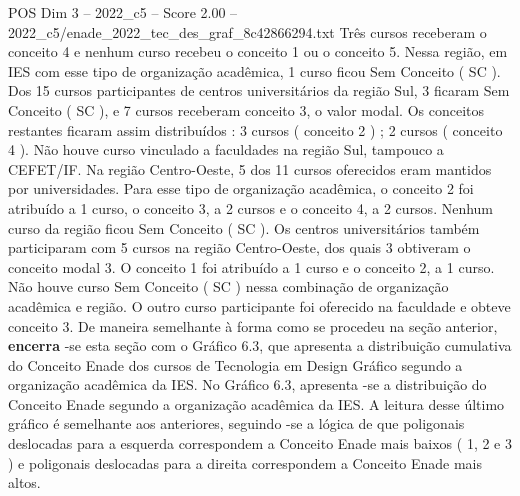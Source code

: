 \begin{textsample}{POS Dim 3 – 2022\_c5 – Score 2.00 – 2022\_c5/enade\_2022\_tec\_des\_graf\_8c42866294.txt}
Três cursos receberam o conceito 4 e nenhum curso recebeu o conceito 1 ou o conceito 5.
Nessa região, em IES com esse tipo de organização acadêmica, 1 curso ficou Sem Conceito ( SC ).
Dos 15 cursos participantes de centros universitários da região Sul, 3 ficaram Sem Conceito ( SC ), e 7 cursos receberam conceito 3, o valor modal.
Os conceitos restantes ficaram assim distribuídos : 3 cursos ( conceito 2 ) ; 2 cursos ( conceito 4 ).
Não houve curso vinculado a faculdades na região Sul, tampouco a CEFET/IF.
Na região Centro-Oeste, 5 dos 11 cursos oferecidos eram mantidos por universidades.
Para esse tipo de organização acadêmica, o conceito 2 foi atribuído a 1 curso, o conceito 3, a 2 cursos e o conceito 4, a 2 cursos.
Nenhum curso da região ficou Sem Conceito ( SC ).
Os centros universitários também participaram com 5 cursos na região Centro-Oeste, dos quais 3 obtiveram o conceito modal 3.
O conceito 1 foi atribuído a 1 curso e o conceito 2, a 1 curso.
Não houve curso Sem Conceito ( SC ) nessa combinação de organização acadêmica e região.
O outro curso participante foi oferecido na faculdade e obteve conceito 3.
De maneira semelhante à forma como se procedeu na seção anterior, \textbf{encerra} -se esta seção com o Gráfico 6.3, que apresenta a distribuição cumulativa do Conceito Enade dos cursos de Tecnologia em Design Gráfico segundo a organização acadêmica da IES.
No Gráfico 6.3, apresenta -se a distribuição do Conceito Enade segundo a organização acadêmica da IES.
A leitura desse último gráfico é semelhante aos anteriores, seguindo -se a lógica de que poligonais deslocadas para a esquerda correspondem a Conceito Enade mais baixos ( 1, 2 e 3 ) e poligonais deslocadas para a direita correspondem a Conceito Enade mais altos.

\end{textsample}
